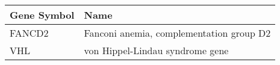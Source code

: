 \begin{tabular}{ll}
\toprule
Gene Symbol &                                     Name \\
\midrule
     FANCD2 & Fanconi anemia, complementation group D2 \\
        VHL &          von Hippel-Lindau syndrome gene \\
\bottomrule
\end{tabular}
